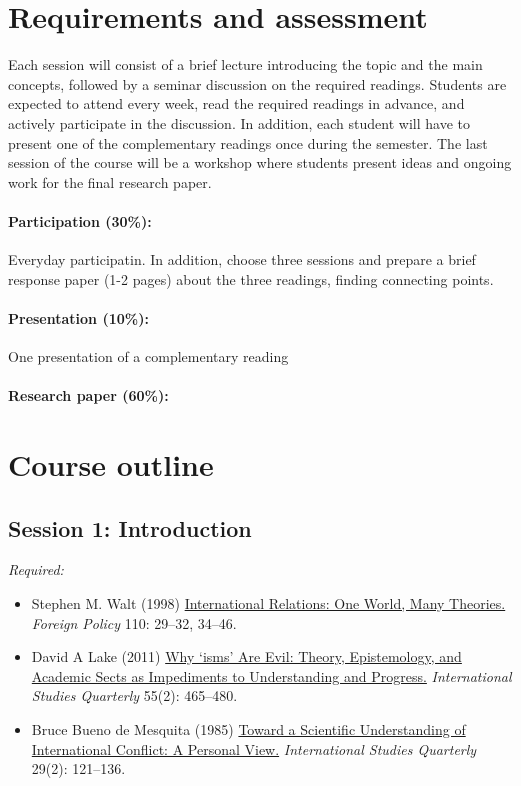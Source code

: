 \documentclass[12pt, a4paper]{article}
\begin{document}
\section{Requirements and assessment}

Each session will consist of a brief lecture introducing the topic and the main concepts, followed by a seminar discussion on the required readings. Students are expected to attend every week, read the required readings in advance, and actively participate in the discussion.
In addition, each student will have to present one of the complementary readings once during the semester.
The last session of the course will be a workshop where students present ideas and ongoing work for the final research paper.

\paragraph{Participation (30\%):} Everyday participatin. In addition, choose three sessions and prepare a brief response paper (1-2 pages) about the three readings, finding connecting points.

\paragraph{Presentation (10\%):} One presentation of a complementary reading

\paragraph{Research paper (60\%):}

\section{Course outline}


\subsection*{Session 1: Introduction}

\noindent\textit{Required:}

\begin{itemize}
  \item Stephen M. Walt (1998) \href{https://doi.org/10.2307/1149275}{International Relations: One World, Many Theories.} \textit{Foreign Policy} 110: 29--32, 34--46.
  \item David A Lake (2011) \href{https://academic.oup.com/isq/article/55/2/465/1796473}{Why `isms' Are Evil: Theory, Epistemology, and Academic Sects as Impediments to Understanding and Progress.} \textit{International Studies Quarterly} 55(2): 465--480.
  \item Bruce Bueno de Mesquita (1985) \href{https://doi.org/10.2307/2600500}{Toward a Scientific Understanding of International Conflict: A Personal View.} \textit{International Studies Quarterly} 29(2): 121--136.
\end{itemize}
\end{document}
